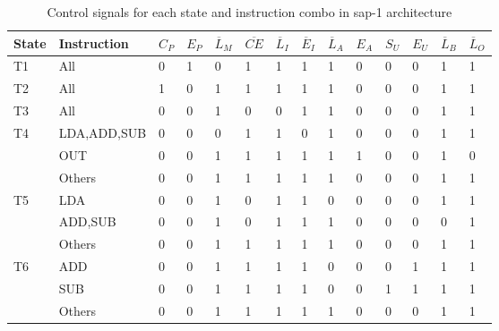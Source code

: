 \begin{table}[hbpt]
    \centering
    \caption{\label{tab:sap1control}Control signals for each state and instruction combo in \gls{sap-1} architecture}
    \begin{tabular}{p{0.8cm}lp{0.3cm}p{0.3cm}p{0.3cm}p{0.3cm}p{0.3cm}p{0.3cm}p{0.3cm}p{0.3cm}p{0.3cm}p{0.3cm}p{0.3cm}p{0.3cm}}
    \textbf{State} & \textbf{Instruction} & $C_P$ & $E_P$ & $\overline{L}_M$ & $\overline{CE}$ & $\overline{L}_I$ & $\overline{E}_I$ & $\overline{L}_A$ & $E_A$ & $S_U$ & $E_U$ & $\overline{L}_B$ & $\overline{L}_O$\\
    \hline
    T1 &All&	        0&	1&	0&	1&	1&	1&	1&	0&	0&	0&	1&	1\\
    \hline
    T2 &All&	        1&	0&	1&	1&	1&	1&	1&	0&	0&	0&	1&	1\\
    \hline
    T3 &All&	        0&	0&	1&	0&	0&	1&	1&	0&	0&	0&	1&	1\\
    \hline
    \multirow{3}{*}{T4}& LDA,ADD,SUB &  0&	0&	0&	1&	1&	0&	1&	0&	0&	0&	1&	1\\
    \cline{2-14}
    & OUT&	        0&	0&	1&	1&	1&	1&	1&	1&	0&	0&	1&	0\\
    \cline{2-14}
    & Others&	    0&	0&	1&	1&	1&	1&	1&	0&	0&	0&	1&	1\\
    \hline
    \multirow{3}{*}{T5} &LDA&	        0&	0&	1&	0&	1&	1&	0&	0&	0&	0&	1&	1\\
    \cline{2-14}
    &ADD,SUB&	    0&	0&	1&	0&	1&	1&	1&	0&	0&	0&	0&	1\\
    \cline{2-14}
    &Others&	    0&	0&	1&	1&	1&	1&	1&	0&	0&	0&	1&	1\\
    \hline
    \multirow{3}{*}{T6} &ADD&	        0&	0&	1&	1&	1&	1&	0&	0&	0&	1&	1&	1\\
    \cline{2-14}
    &SUB&	        0&	0&	1&	1&	1&	1&	0&	0&	1&	1&	1&	1\\
    \cline{2-14}
    &Others&	    0&	0&	1&	1&	1&	1&	1&	0&	0&	0&	1&	1\\
    \hline
    \end{tabular}
\end{table}

